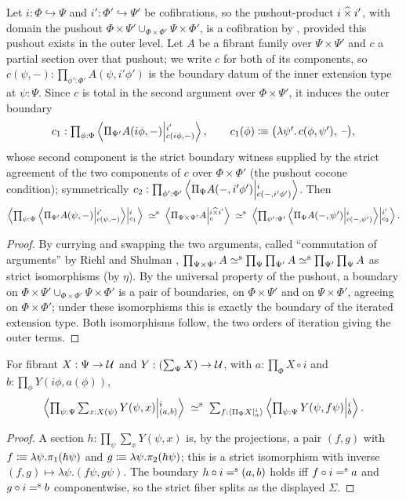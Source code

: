 \begin{lemma}\label{lem:rs42}
	Let $i:\Phi\hookrightarrow\Psi$ and $i':\Phi'\hookrightarrow\Psi'$ be
	cofibrations, so the pushout-product $i\poprod i'$, with domain the pushout
	$\Phi\times\Psi'\cup_{\Phi\times\Phi'}\Psi\times\Phi'$, is a cofibration
	by \citet[Lem.~3.23]{2LTT}, provided this pushout exists in the outer level.
	Let $A$ be a fibrant family over $\Psi\times\Psi'$ and $c$ a partial section
	over that pushout; we write $c$ for both of its components, so
	$c(\psi,-):\prod_{\phi':\Phi'}A(\psi,i'\phi')$ is the boundary datum of the
	inner extension type at $\psi:\Psi$. Since $c$ is total in the second argument
	over $\Phi\times\Psi'$, it induces the outer boundary
	\[
		c_1:\textstyle\prod_{\phi:\Phi}\Ext{i'}{\Pi_{\Psi'}A(i\phi,-)}{c(i\phi,-)},
		\qquad
		c_1(\phi)\colonequiv\bigl(\lambda\psi'.\,c(\phi,\psi'),\;\text{--}\bigr),
	\]
	whose second component is the strict boundary witness supplied by the strict
	agreement of the two components of $c$ over $\Phi\times\Phi'$ (the pushout
	cocone condition); symmetrically
	$c_2:\prod_{\phi':\Phi'}\Ext{i}{\Pi_\Psi A(-,i'\phi')}{c(-,i'\phi')}$.
	Then
	\[
		\Ext{i}{\textstyle\prod_{\psi:\Psi}\Ext{i'}{\Pi_{\Psi'}A(\psi,-)}{c(\psi,-)}}{c_1}\;\siso\;\Ext{i\poprod i'}{\Pi_{\Psi\times\Psi'}A}{c}\;\siso\;\Ext{i'}{\textstyle\prod_{\psi':\Psi'}\Ext{i}{\Pi_\Psi A(-,\psi')}{c(-,\psi')}}{c_2}.
	\]
\end{lemma}
\begin{proof}
	By currying and swapping the two arguments, called \enquote{commutation of
	arguments} by Riehl and Shulman \citep[\S4.1]{RS2017},
	$\prod_{\Psi\times\Psi'}A\siso\prod_\Psi\prod_{\Psi'}A\siso\prod_{\Psi'}\prod_\Psi A$
	as strict isomorphisms (by $\eta$). By the universal property of the pushout, a
	boundary on $\Phi\times\Psi'\cup_{\Phi\times\Phi'}\Psi\times\Phi'$ is a pair of
	boundaries, on $\Phi\times\Psi'$ and on $\Psi\times\Phi'$, agreeing on
	$\Phi\times\Phi'$; under these isomorphisms this is exactly the boundary of the
	iterated extension type. Both isomorphisms follow, the two orders of iteration
	giving the outer terms.
\end{proof}

\begin{lemma}\label{lem:rs43}
	For fibrant $X:\Psi\to\UU$ and $Y:(\sum_\Psi X)\to\UU$, with $a:\prod_\Phi X\circ i$
	and $b:\prod_{\phi}Y(i\phi,a(\phi))$,
	\[
		\Ext{i}{\textstyle\prod_{\psi:\Psi}\sum_{x:X(\psi)}Y(\psi,x)}{(a,b)}\;\siso\;\textstyle\sum_{f:\Ext{i}{\Pi_\Psi X}{a}}\Ext{i}{\textstyle\prod_{\psi:\Psi}Y(\psi,f\psi)}{b}.
	\]
\end{lemma}
\begin{proof}
	A section $h:\prod_\psi\sum_{x}Y(\psi,x)$ is, by the projections, a pair
	$(f,g)$ with $f\colonequiv\lambda\psi.\pi_1(h\psi)$ and
	$g\colonequiv\lambda\psi.\pi_2(h\psi)$; this is a strict isomorphism with
	inverse $(f,g)\mapsto\lambda\psi.(f\psi,g\psi)$. The boundary $h\circ i\seq(a,b)$
	holds iff $f\circ i\seq a$ and $g\circ i\seq b$ componentwise, so the strict
	fiber splits as the displayed $\Sigma$.
\end{proof}

